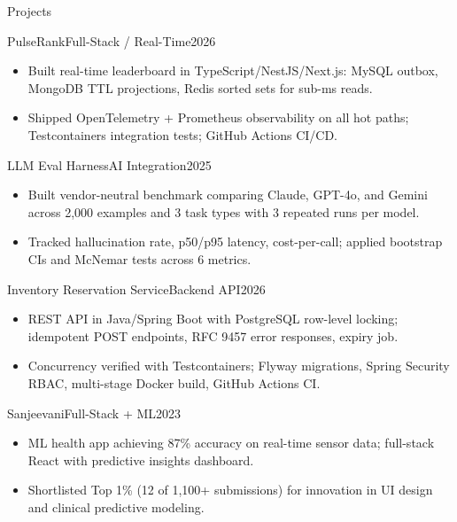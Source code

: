 \documentclass[]{mcdowellcv}
\begin{document}
\begin{cvsection}{Projects}
  \begin{cvsubsection}{PulseRank}{Full-Stack / Real-Time}{2026}
    \begin{itemize}
      \item Built real-time leaderboard in TypeScript/NestJS/Next.js: MySQL outbox, MongoDB TTL projections, Redis sorted sets for sub-ms reads.
      \item Shipped OpenTelemetry + Prometheus observability on all hot paths; Testcontainers integration tests; GitHub Actions CI/CD.
    \end{itemize}
    \vspace{-1.5pt}
  \end{cvsubsection}

  \begin{cvsubsection}{LLM Eval Harness}{AI Integration}{2025}
    \begin{itemize}
      \item Built vendor-neutral benchmark comparing Claude, GPT-4o, and Gemini across 2,000 examples and 3 task types with 3 repeated runs per model.
      \item Tracked hallucination rate, p50/p95 latency, cost-per-call; applied bootstrap CIs and McNemar tests across 6 metrics.
    \end{itemize}
    \vspace{-1.5pt}
  \end{cvsubsection}

  \begin{cvsubsection}{Inventory Reservation Service}{Backend API}{2026}
    \begin{itemize}
      \item REST API in Java/Spring Boot with PostgreSQL row-level locking; idempotent POST endpoints, RFC 9457 error responses, expiry job.
      \item Concurrency verified with Testcontainers; Flyway migrations, Spring Security RBAC, multi-stage Docker build, GitHub Actions CI.
    \end{itemize}
    \vspace{-1.5pt}
  \end{cvsubsection}

  \begin{cvsubsection}{Sanjeevani}{Full-Stack + ML}{2023}
    \begin{itemize}
      \item ML health app achieving 87\% accuracy on real-time sensor data; full-stack React with predictive insights dashboard.
      \item Shortlisted Top 1\% (12 of 1,100+ submissions) for innovation in UI design and clinical predictive modeling.
    \end{itemize}
  \end{cvsubsection}
\end{cvsection}
\end{document}

